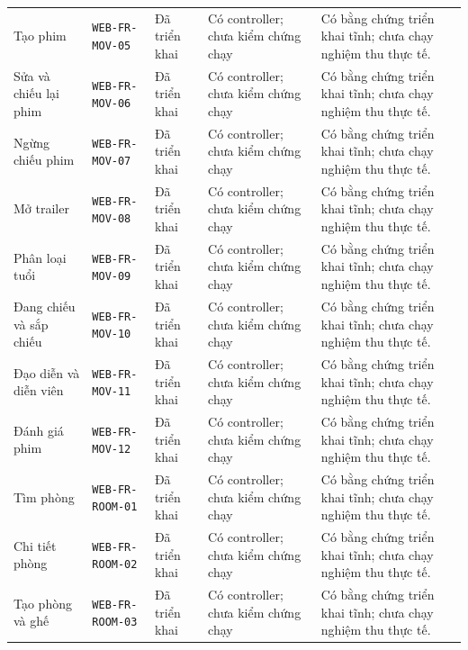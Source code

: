 \begin{longtable}{@{}P{0.19000\SRSWidth}P{0.18000\SRSWidth}P{0.15000\SRSWidth}P{0.20000\SRSWidth}P{0.28000\SRSWidth}@{}}
Tạo phim & \texttt{WEB-\allowbreak{}FR-\allowbreak{}MOV-\allowbreak{}05} & Đã triển khai & Có controller; chưa kiểm chứng chạy & Có bằng chứng triển khai tĩnh; chưa chạy nghiệm thu thực tế. \\[3pt]
Sửa và chiếu lại phim & \texttt{WEB-\allowbreak{}FR-\allowbreak{}MOV-\allowbreak{}06} & Đã triển khai & Có controller; chưa kiểm chứng chạy & Có bằng chứng triển khai tĩnh; chưa chạy nghiệm thu thực tế. \\[3pt]
Ngừng chiếu phim & \texttt{WEB-\allowbreak{}FR-\allowbreak{}MOV-\allowbreak{}07} & Đã triển khai & Có controller; chưa kiểm chứng chạy & Có bằng chứng triển khai tĩnh; chưa chạy nghiệm thu thực tế. \\[3pt]
Mở trailer & \texttt{WEB-\allowbreak{}FR-\allowbreak{}MOV-\allowbreak{}08} & Đã triển khai & Có controller; chưa kiểm chứng chạy & Có bằng chứng triển khai tĩnh; chưa chạy nghiệm thu thực tế. \\[3pt]
Phân loại tuổi & \texttt{WEB-\allowbreak{}FR-\allowbreak{}MOV-\allowbreak{}09} & Đã triển khai & Có controller; chưa kiểm chứng chạy & Có bằng chứng triển khai tĩnh; chưa chạy nghiệm thu thực tế. \\[3pt]
Đang chiếu và sắp chiếu & \texttt{WEB-\allowbreak{}FR-\allowbreak{}MOV-\allowbreak{}10} & Đã triển khai & Có controller; chưa kiểm chứng chạy & Có bằng chứng triển khai tĩnh; chưa chạy nghiệm thu thực tế. \\[3pt]
Đạo diễn và diễn viên & \texttt{WEB-\allowbreak{}FR-\allowbreak{}MOV-\allowbreak{}11} & Đã triển khai & Có controller; chưa kiểm chứng chạy & Có bằng chứng triển khai tĩnh; chưa chạy nghiệm thu thực tế. \\[3pt]
Đánh giá phim & \texttt{WEB-\allowbreak{}FR-\allowbreak{}MOV-\allowbreak{}12} & Đã triển khai & Có controller; chưa kiểm chứng chạy & Có bằng chứng triển khai tĩnh; chưa chạy nghiệm thu thực tế. \\[3pt]
Tìm phòng & \texttt{WEB-\allowbreak{}FR-\allowbreak{}ROOM-\allowbreak{}01} & Đã triển khai & Có controller; chưa kiểm chứng chạy & Có bằng chứng triển khai tĩnh; chưa chạy nghiệm thu thực tế. \\[3pt]
Chi tiết phòng & \texttt{WEB-\allowbreak{}FR-\allowbreak{}ROOM-\allowbreak{}02} & Đã triển khai & Có controller; chưa kiểm chứng chạy & Có bằng chứng triển khai tĩnh; chưa chạy nghiệm thu thực tế. \\[3pt]
Tạo phòng và ghế & \texttt{WEB-\allowbreak{}FR-\allowbreak{}ROOM-\allowbreak{}03} & Đã triển khai & Có controller; chưa kiểm chứng chạy & Có bằng chứng triển khai tĩnh; chưa chạy nghiệm thu thực tế. \\[3pt]

\end{longtable}
